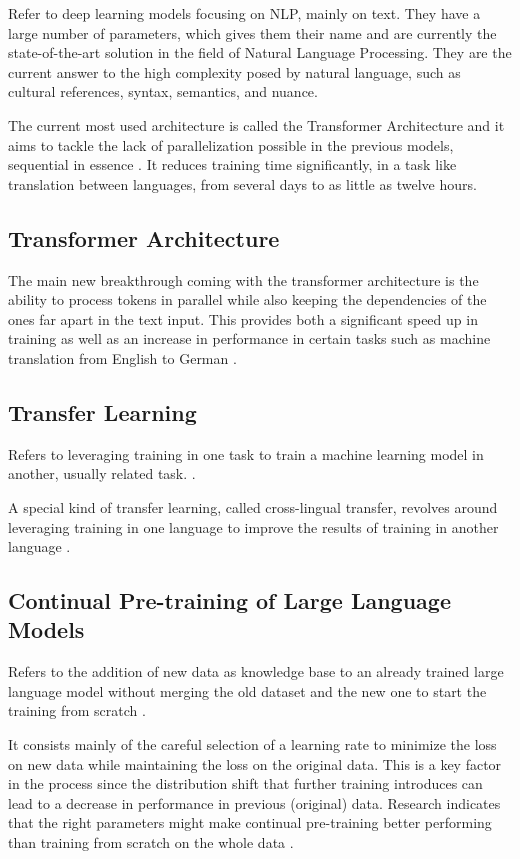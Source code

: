 Refer to deep learning models focusing on NLP, mainly on text. They have a large number of parameters, which gives them their name and are currently the state-of-the-art solution in the field of Natural Language Processing. They are the current answer to the high complexity posed by natural language, such as cultural references, syntax, semantics, and nuance.

The current most used architecture is called the Transformer Architecture and it aims to tackle the lack of parallelization possible in the previous models, sequential in essence \cite{vaswani2017attention}. It reduces training time significantly, in a task like translation between languages, from several days \cite{bahdanau2014neural} to as little as twelve hours.


\subsection{Transformer Architecture}


The main new breakthrough coming with the transformer architecture is the ability to process tokens in parallel while also keeping the dependencies of the ones far apart in the text input. This provides both a significant speed up in training as well as an increase in performance in certain tasks such as machine translation from English to German \cite{vaswani2017attention}.

\subsection{Transfer Learning}

Refers to leveraging training in one task to train a machine learning model in another, usually related task. \cite{torrey2010transfer}. 

A special kind of transfer learning, called cross-lingual transfer, revolves around leveraging training in one language to improve the results of training in another language \cite{cross_lingual_transfer}.

\subsection{Continual Pre-training of Large Language Models}
Refers to the addition of new data as knowledge base to an already trained large language model without merging the old dataset and the new one to start the training from scratch \cite{gupta2023continual}.

It consists mainly of the careful selection of a learning rate to minimize the loss on new data while maintaining the loss on the original data. This is a key factor in the process since the distribution shift that further training introduces can lead to a decrease in performance in previous (original) data. Research indicates that the right parameters might make continual pre-training better performing than training from scratch on the whole data \cite{gupta2023continual}.


